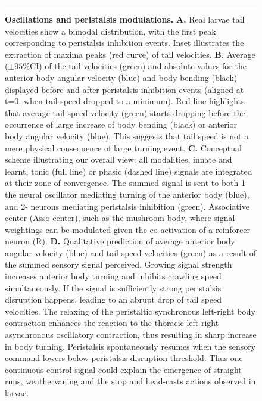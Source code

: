 \documentclass[11pt,a4paper]{article}
\begin{document}
\begin{figure}
\begin{center}
\caption{{\bf Oscillations and peristalsis modulations.} {\bf A.} Real larvae tail velocities show a bimodal distribution, with the first peak corresponding to peristalsis inhibition events. Inset illustrates the extraction of maxima peaks (red curve) of tail velocities.
{\bf B.} Average ($\pm 95\%$CI) of the tail velocities (green) and absolute values for the anterior body angular velocity (blue) and body bending (black) displayed before and after peristalsis inhibition events (aligned at t=0, when tail speed dropped to a minimum). Red line highlights that average tail speed velocity (green) starts dropping before the occurrence of large increase of body bending (black) or anterior body angular velocity (blue). This suggests that tail speed is not a mere physical consequence of large turning event.
{\bf C.} Conceptual scheme illustrating our overall view: all modalities, innate and learnt, tonic (full line) or phasic (dashed line) signals are integrated at their zone of convergence. The summed signal is sent to both 1-the  neural oscillator mediating turning of the anterior body (blue), and 2- neurons mediating peristalsis inhibition (green).  Associative center (Asso center), such as the mushroom body, where signal weightings can be modulated given the co-activation of a reinforcer neuron (R). 
{\bf D.} Qualitative prediction of average anterior body angular velocity (blue) and tail speed velocities (green) as a result of the summed sensory signal perceived. Growing signal strength increases anterior body turning and inhibits crawling speed simultaneously. If the signal is sufficiently strong peristalsis disruption happens, leading to an abrupt drop of tail speed velocities. The relaxing of the  peristaltic synchronous left-right body contraction enhances the reaction to the thoracic left-right asynchronous oscillatory contraction, thus resulting in sharp increase in body turning. Peristalsis spontaneously resumes when the sensory command lowers below peristalsis disruption threshold. Thus one continuous control signal could explain the emergence of straight runs, weathervaning and the stop and head-casts actions observed in larvae.
\label{fig:Peristalsis}}
\hrule
\end{center}
\end{figure}
\end{document}

